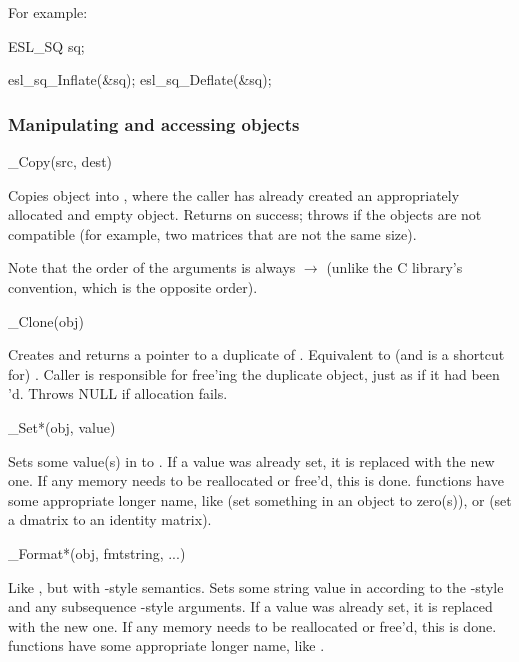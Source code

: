 For example:

\begin{cchunk}
   ESL_SQ  sq;

   esl_sq_Inflate(&sq);
   esl_sq_Deflate(&sq);
\end{cchunk}


  \subsubsection{Manipulating and accessing objects}

\begin{sreapi}
\hypertarget{ifc:Copy}
{\item[\_Copy(src, dest)]}

Copies  object into , where the caller has
already created an appropriately allocated and empty 
object. Returns  on success; throws
 if the objects are not compatible (for example,
two matrices that are not the same size).

Note that the order of the arguments is always 
$\rightarrow$  (unlike the C library's 
convention, which is the opposite order).

\hypertarget{ifc:Clone}
{\item[\_Clone(obj)]}

Creates and returns a pointer to a duplicate of .
Equivalent to (and is a shortcut for) . Caller is responsible for free'ing the duplicate
object, just as if it had been 'd. Throws NULL if
allocation fails.

\hypertarget{ifc:Set}
{\item[\_Set*(obj, value)]}

Sets some value(s) in  to . If a value was
already set, it is replaced with the new one. If any memory needs to
be reallocated or free'd, this is done.  functions have
some appropriate longer name, like  (set something
in an object to zero(s)), or  (set
a dmatrix to an identity matrix).

\hypertarget{ifc:Format}
{\item[\_Format*(obj, fmtstring, ...)]}

Like , but with -style semantics.  Sets
some string value in  according to the
-style  and any subsequence
-style arguments. If a value was already set, it is
replaced with the new one. If any memory needs to be reallocated or
free'd, this is done.   functions have some
appropriate longer name, like
.


\end{sreapi}
